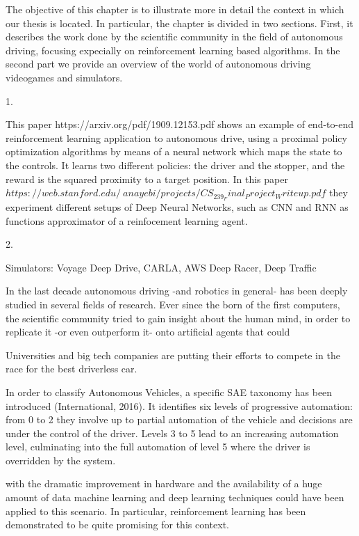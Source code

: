 The objective of this chapter is to illustrate more in detail the context in which our thesis is located.
In particular, the chapter is divided in two sections. First, it describes the work done by the scientific community in the field of autonomous driving, focusing expecially on reinforcement learning based algorithms.
In the second part we provide an overview of the world of autonomous driving videogames and simulators.



1. 

This paper https://arxiv.org/pdf/1909.12153.pdf shows an example of end-to-end reinforcement learning application to autonomous drive, using a proximal policy optimization algorithms by means of a neural network which maps the state to the controls. It learns two different policies: the driver and the stopper, and the reward is the squared proximity to a target position.
In this paper $https://web.stanford.edu/~anayebi/projects/CS_239_Final_Project_Writeup.pdf$ they experiment different setups of Deep Neural Networks, such as CNN and RNN as functions approximator of a reinfocement learning agent.


2. 



Simulators: Voyage Deep Drive, CARLA, AWS Deep Racer, Deep Traffic





			
In the last decade autonomous driving -and robotics in general- has been deeply studied in several fields of research. 
Ever since the born of the first computers, the scientific community tried to gain insight about the human mind, in order to replicate it -or even outperform it- onto artificial agents that could 


Universities and big tech companies are putting their efforts to compete in the race for the best driverless car. 



In order to classify Autonomous Vehicles, a specific SAE taxonomy has been introduced (International, 2016). It identifies six levels of progressive automation: from 0 to 2 they
involve up to partial automation of the vehicle and decisions are under the control of the
driver. Levels 3 to 5 lead to an increasing automation level, culminating into the full
automation of level 5 where the driver is overridden by the system.



with the dramatic improvement in hardware and the availability of a huge amount of data machine learning and deep learning techniques could have been applied to this scenario. 
In particular, reinforcement learning has been demonstrated to be quite promising for this context.





